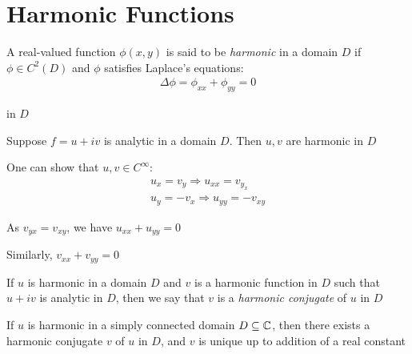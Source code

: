 \section{Harmonic Functions}
\par\bigskip
\begin{theo}{}
  A real-valued function $\phi(x,y)$ is said to be \textit{harmonic} in a domain $D$ if $\phi\in C^2(D)$ and $\phi$ satisfies Laplace's equations:
  \begin{equation*}
    \begin{gathered}
      \Delta\phi = \phi_{xx}+\phi_{yy} = 0
    \end{gathered}
  \end{equation*}\par
  \noindent in $D$
\end{theo}
\par\bigskip
\begin{theo}[]{}
  Suppose $f = u+iv$ is analytic in a domain $D$. Then $u,v$ are harmonic in $D$
\end{theo}
\par\bigskip
\begin{prf}[]{}
  One can show that $u,v\in C^\infty$:
  \begin{equation*}
    \begin{gathered}
      u_x = v_y\Rightarrow u_{xx} = v_{y_x}\\
      u_y = -v_x\Rightarrow u_{yy} = -v_{xy}
    \end{gathered}
  \end{equation*}
  \par\bigskip
  \noindent As $v_{yx} = v_{xy}$, we have $u_{xx}+u_{yy} = 0$
  \par\bigskip
  \noindent Similarly, $v_{xx}+v_{yy} = 0$
  \par\bigskip
\end{prf}
\par\bigskip
\begin{theo}{}
  If $u$ is harmonic in a domain $D$ and $v$ is a harmonic function in $D$ such that $u+iv$ is analytic in $D$, then we say that $v$ is a \textit{harmonic conjugate}  of $u$ in $D$
\end{theo}
\par\bigskip
\begin{theo}[]{}
  If $u$ is harmonic in a simply connected domain $D\subseteq\mathbb{C}$, then there exists a harmonic conjugate $v$ of $u$ in $D$, and $v$ is unique up to addition of a real constant
\end{theo}
